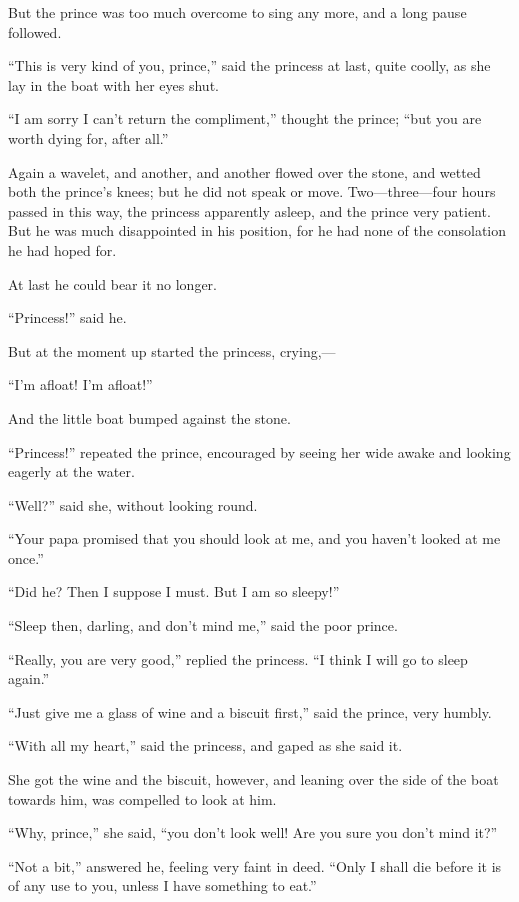 \documentclass[12pt]{memoir}
\begin{document}
But the prince was too much overcome to sing any more, and a long
pause followed.

``This is very kind of you, prince,'' said the princess at last, quite
coolly, as she lay in the boat with her eyes shut.

``I am sorry I can't return the compliment,'' thought the prince;
``but you are worth dying for, after all.''

Again a wavelet, and another, and another flowed over the stone, and
wetted both the prince's knees; but he did not speak or move.
Two---three---four hours passed in this way, the princess apparently
asleep, and the prince very patient.  But he was much disappointed in
his position, for he had none of the consolation he had hoped for.

At last he could bear it no longer.

``Princess!'' said he.

But at the moment up started the princess, crying,---

``I'm afloat!  I'm afloat!''

And the little boat bumped against the stone.

``Princess!'' repeated the prince, encouraged by seeing her wide awake
and looking eagerly at the water.

``Well?'' said she, without looking round.

``Your papa promised that you should look at me, and you haven't
looked at me once.''

``Did he?  Then I suppose I must.  But I am so sleepy!''

``Sleep then, darling, and don't mind me,'' said the poor prince.

``Really, you are very good,'' replied the princess.  ``I think I will
go to sleep again.''

``Just give me a glass of wine and a biscuit first,'' said the prince,
very humbly.

``With all my heart,'' said the princess, and gaped as she said it.

She got the wine and the biscuit, however, and leaning over the side
of the boat towards him, was compelled to look at him.

``Why, prince,'' she said, ``you don't look well!  Are you sure you
don't mind it?''

``Not a bit,'' answered he, feeling very faint in deed.  ``Only I
shall die before it is of any use to you, unless I have something to
eat.''
\end{document}
